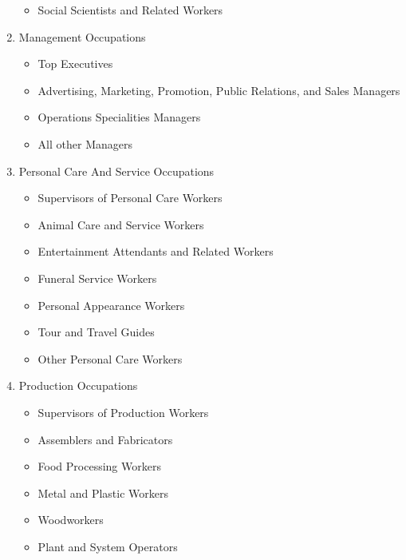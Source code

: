 \documentclass{article}
\begin{document}
\begin{enumerate}
\begin{itemize}
            \item Social Scientists and Related Workers
        \end{itemize}
    \item  Management Occupations
        \begin{itemize}
            \item Top Executives
            \item Advertising, Marketing, Promotion, Public Relations, and Sales Managers
            \item Operations Specialities Managers
            \item All other Managers
        \end{itemize}
    \item  Personal Care And Service Occupations
        \begin{itemize}
            \item Supervisors of Personal Care Workers
            \item Animal Care and Service Workers
            \item Entertainment Attendants and Related Workers
            \item Funeral Service Workers
            \item Personal Appearance Workers
            \item Tour and Travel Guides
            \item Other Personal Care Workers
        \end{itemize}
    \item  Production Occupations
        \begin{itemize}
            \item Supervisors of Production Workers
            \item Assemblers and Fabricators
            \item Food Processing Workers
            \item Metal and Plastic Workers
            \item Woodworkers
            \item Plant and System Operators
        \end{itemize}
\end{enumerate}
\newpage
\end{document}
